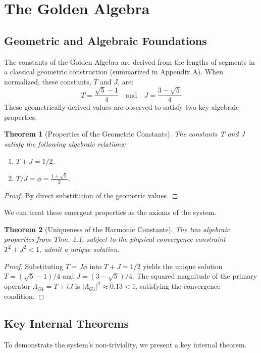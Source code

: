 \documentclass{article}
\theoremstyle{plain}
\newtheorem{theorem}{Theorem}[section]
\theoremstyle{definition}
\begin{document}
\section{The Golden Algebra}
\subsection{Geometric and Algebraic Foundations}
The constants of the Golden Algebra are derived from the lengths of segments in a classical geometric construction (summarized in Appendix A). When normalized, these constants, $T$ and $J$, are:
$$ T = \frac{\sqrt{5}-1}{4} \quad \text{and} \quad J = \frac{3-\sqrt{5}}{4} $$
These geometrically-derived values are observed to satisfy two key algebraic properties.

\begin{theorem}[Properties of the Geometric Constants]
The constants T and J satisfy the following algebraic relations:
\begin{enumerate}
    \item $T+J = 1/2$.
    \item $T/J = \phi = \frac{1+\sqrt{5}}{2}$.
\end{enumerate}
\end{theorem}
\begin{proof}
By direct substitution of the geometric values.
\end{proof}

We can treat these emergent properties as the axioms of the system.
\begin{theorem}[Uniqueness of the Harmonic Constants]
The two algebraic properties from Thm. 2.1, subject to the physical convergence constraint $T^2+J^2 < 1$, admit a unique solution.
\end{theorem}
\begin{proof}
Substituting $T=J\phi$ into $T+J=1/2$ yields the unique solution $T=(\sqrt{5}-1)/4$ and $J=(3-\sqrt{5})/4$. The squared magnitude of the primary operator $\Lambda_{G1} = T+iJ$ is $|\Lambda_{G1}|^2 \approx 0.13 < 1$, satisfying the convergence condition.
\end{proof}

\subsection{Key Internal Theorems}
To demonstrate the system's non-triviality, we present a key internal theorem.
\end{document}
